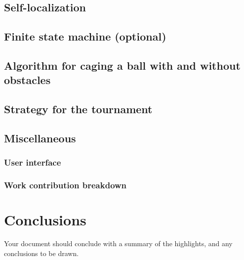 \documentclass[703030]{iisreport}
\begin{document}
\subsection{Self-localization}

\subsection{Finite state machine (optional)}

\subsection{Algorithm for caging a ball with and without obstacles}

\subsection{Strategy for the tournament}

\subsection{Miscellaneous}
  \subsubsection{User interface}
  \subsubsection{Work contribution breakdown}


\section{Conclusions}

Your document should conclude with a summary of the highlights, and any conclusions to be drawn.


\end{document}
